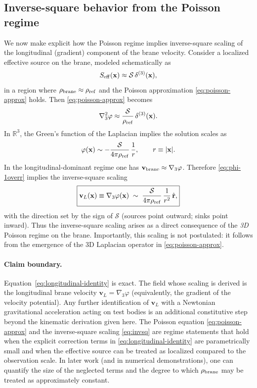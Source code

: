 \documentclass[11pt]{article}
\newcommand{\rhoref}{\rho_{\rm ref}}
\begin{document}
\subsection{Inverse-square behavior from the Poisson regime}
\label{sec:poisson-invsq}

We now make explicit how the Poisson regime implies inverse-square scaling of the longitudinal (gradient) component of the brane velocity. Consider a localized effective source on the brane, modeled schematically as
\begin{equation}
S_{\rm eff}(\mathbf{x}) \approx \mathcal{S}\,\delta^{(3)}(\mathbf{x}),
\end{equation}
in a region where $\rho_{\rm brane}\approx\rhoref$ and the Poisson approximation \eqref{eq:poisson-approx} holds. Then \eqref{eq:poisson-approx} becomes
\begin{equation}
\nabla_3^2\varphi \approx \frac{\mathcal{S}}{\rhoref}\,\delta^{(3)}(\mathbf{x}).
\end{equation}
In $\mathbb{R}^3$, the Green's function of the Laplacian implies the solution scales as
\begin{equation}
\varphi(\mathbf{x}) \sim -\frac{\mathcal{S}}{4\pi\rhoref}\,\frac{1}{r},
\qquad
r\equiv |\mathbf{x}|.
\label{eq:phi-1overr}
\end{equation}
In the longitudinal-dominant regime one has $\mathbf{v}_{\rm brane}\approx\nabla_3\varphi$. Therefore \eqref{eq:phi-1overr} implies the inverse-square scaling
\begin{equation}
\boxed{
\mathbf{v}_L(\mathbf{x})\equiv\nabla_3\varphi(\mathbf{x})
\;\sim\; \frac{\mathcal{S}}{4\pi\rhoref}\,\frac{1}{r^2}\,\hat{\mathbf{r}},
}
\label{eq:invsq}
\end{equation}
with the direction set by the sign of $\mathcal{S}$ (sources point outward; sinks point inward). Thus the inverse-square scaling arises as a direct consequence of the \emph{3D} Poisson regime on the brane. Importantly, this scaling is not postulated: it follows from the emergence of the 3D Laplacian operator in \eqref{eq:poisson-approx}.

\paragraph{Claim boundary.}
Equation~\eqref{eq:longitudinal-identity} is exact. The field whose scaling is derived is the longitudinal brane velocity $\mathbf{v}_L=\nabla_3\varphi$ (equivalently, the gradient of the velocity potential). Any further identification of $\mathbf{v}_L$ with a Newtonian gravitational acceleration acting on test bodies is an additional constitutive step beyond the kinematic derivation given here. The Poisson equation \eqref{eq:poisson-approx} and the inverse-square scaling \eqref{eq:invsq} are regime statements that hold when the explicit correction terms in \eqref{eq:longitudinal-identity} are parametrically small and when the effective source can be treated as localized compared to the observation scale. In later work (and in numerical demonstrations), one can quantify the size of the neglected terms and the degree to which $\rho_{\rm brane}$ may be treated as approximately constant.
\end{document}
